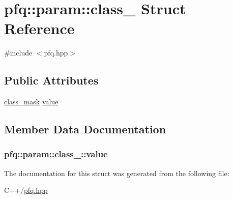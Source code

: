 \hypertarget{structpfq_1_1param_1_1class__}{\section{pfq\+:\+:param\+:\+:class\+\_\+ Struct Reference}
\label{structpfq_1_1param_1_1class__}
}


{\ttfamily \#include $<$pfq.\+hpp$>$}

\subsection*{Public Attributes}
\begin{DoxyCompactItemize}
\item 
\hyperlink{namespacepfq_a96af1f5ed530eff563eb917516758fbb}{class\+\_\+mask} \hyperlink{structpfq_1_1param_1_1class___a014cc8b1b64e04bbcd9d8f2ed793efbb}{value}
\end{DoxyCompactItemize}


\subsection{Member Data Documentation}
\hypertarget{structpfq_1_1param_1_1class___a014cc8b1b64e04bbcd9d8f2ed793efbb}{
\subsubsection[{value}]{ pfq\+::param\+::class\+\_\+\+::value}}\label{structpfq_1_1param_1_1class___a014cc8b1b64e04bbcd9d8f2ed793efbb}


The documentation for this struct was generated from the following file\+:\begin{DoxyCompactItemize}
\item 
C++/\hyperlink{pfq_8hpp}{pfq.\+hpp}\end{DoxyCompactItemize}
